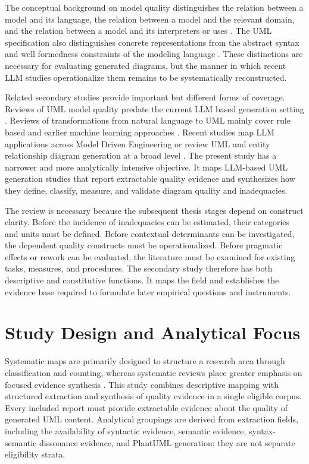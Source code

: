 The conceptual background on model quality distinguishes the relation between a model and its language, the relation between a model and the relevant domain, and the relation between a model and its interpreters or uses \cite{Lindland1994Quality,Krogstie2006Process}. The UML specification also distinguishes concrete representations from the abstract syntax and well formedness constraints of the modeling language \cite{OMG2017UML}. These distinctions are necessary for evaluating generated diagrams, but the manner in which recent LLM studies operationalize them remains to be systematically reconstructed.

Related secondary studies provide important but different forms of coverage. Reviews of UML model quality predate the current LLM based generation setting \cite{Genero2011UMLQuality}. Reviews of transformations from natural language to UML mainly cover rule based and earlier machine learning approaches \cite{Ahmed2022NaturalUML}. Recent studies map LLM applications across Model Driven Engineering or review UML and entity relationship diagram generation at a broad level \cite{Zhang2027LLMMDE,Rahmanian2026Diagrams}. The present study has a narrower and more analytically intensive objective. It maps LLM-based UML generation studies that report extractable quality evidence and synthesizes how they define, classify, measure, and validate diagram quality and inadequacies.

The review is necessary because the subsequent thesis stages depend on construct clarity. Before the incidence of inadequacies can be estimated, their categories and units must be defined. Before contextual determinants can be investigated, the dependent quality constructs must be operationalized. Before pragmatic effects or rework can be evaluated, the literature must be examined for existing tasks, measures, and procedures. The secondary study therefore has both descriptive and constitutive functions. It maps the field and establishes the evidence base required to formulate later empirical questions and instruments.

\section{Study Design and Analytical Focus}
\label{sec:protocol_design}

Systematic maps are primarily designed to structure a research area through classification and counting, whereas systematic reviews place greater emphasis on focused evidence synthesis \cite{Petersen2015Mapping}. This study combines descriptive mapping with structured extraction and synthesis of quality evidence in a single eligible corpus. Every included report must provide extractable evidence about the quality of generated UML content. Analytical groupings are derived from extraction fields, including the availability of syntactic evidence, semantic evidence, syntax-semantic dissonance evidence, and PlantUML generation; they are not separate eligibility strata.


